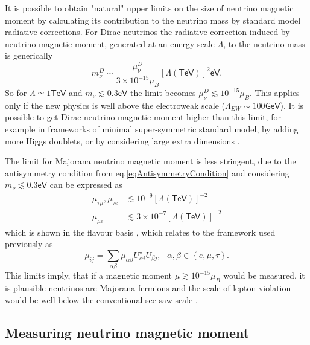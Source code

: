 It is possible \cite{nuMMMajoranaBounds2006.pdf} to obtain "natural" upper limits on the size of neutrino magnetic moment by calculating its contribution to the neutrino mass by standard model radiative corrections. For Dirac neutrinos the radiative correction induced by neutrino magnetic moment, generated at an energy scale $\Lambda$, to the neutrino mass is generically
\begin{equation}
m_{\nu}^D\sim\frac{\mu_{\nu}^D}{3\times 10^{-15}\mu_B}\left[\Lambda\left(\textsf{TeV}\right)\right]^2\textsf{eV}.
\end{equation}
So for $\Lambda\simeq 1\textsf{TeV}$ and $m_{\nu}\lesssim 0.3\textsf{eV}$ the limit becomes $\mu_{\nu}^D\lesssim 10^{-15}\mu_B$. This applies only if the new physics is well above the electroweak scale ($\Lambda_{EW} \sim 100\textsf{GeV}$). It is possible to get Dirac neutrino magnetic moment higher than this limit, for example in frameworks of minimal super-symmetric standard model, by adding more Higgs doublets, or by considering large extra dimensions \cite{nuElmagInt2015.pdf}.

The limit for Majorana neutrino magnetic moment is less stringent, due to the antisymmetry condition from eq.\ref{eqAntisymmetryCondition} and considering $m_{\nu}\lesssim 0.3\textsf{eV}$ can be expressed as
\begin{align}
\mu_{\tau\mu},\mu_{\tau e} &\lesssim 10^{-9}\left[\Lambda\left(\textsf{TeV}\right)\right]^{-2}\\
\mu_{\mu e} &\lesssim 3\times 10^{-7}\left[\Lambda\left(\textsf{TeV}\right)\right]^{-2}
\end{align}
which is shown in the flavour basis , which relates to the framework used previously as
\begin{equation}
\mu_{ij}=\sum_{\alpha\beta}\mu_{\alpha\beta}U^{\star}_{\alpha i}U_{\beta j},\ \ \ \alpha,\beta\in\left\lbrace e,\mu,\tau\right\rbrace.
\end{equation}
This limits imply, that if a magnetic moment $\mu\gtrsim 10^{-15}\mu_B$ would be measured, it is plausible neutrinos are Majorana fermions and the scale of lepton violation would be well below the conventional see-saw scale \cite{nuMMMajoranaBounds2006.pdf}.


\subsection{Measuring neutrino magnetic moment}
